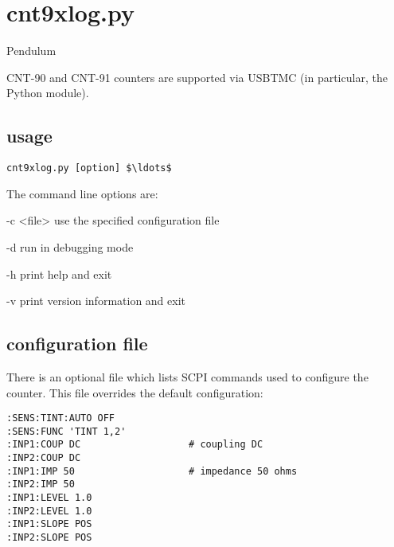 \section{cnt9xlog.py}

\hypertarget{h:cnt9xlog}{Pendulum} CNT-90 and CNT-91 counters are supported via USBTMC (in particular, the Python  module).

\subsection{usage}

\begin{lstlisting}[mathescape=true]
cnt9xlog.py [option] $\ldots$ 
\end{lstlisting}

The command line options are:
\begin{description*}
	\item[-c \textless file\textgreater] use the specified configuration file
	\item[-d]	run in debugging mode
	\item[-h]	print help and exit
	\item[-v]	print version information and exit
\end{description*}

\subsection{configuration file}

There is an optional file  which lists SCPI commands used to configure the counter.
This file overrides the default configuration:
\begin{lstlisting}
:SENS:TINT:AUTO OFF
:SENS:FUNC 'TINT 1,2'
:INP1:COUP DC                   # coupling DC
:INP2:COUP DC
:INP1:IMP 50                    # impedance 50 ohms
:INP2:IMP 50
:INP1:LEVEL 1.0
:INP2:LEVEL 1.0
:INP1:SLOPE POS
:INP2:SLOPE POS
\end{lstlisting}



